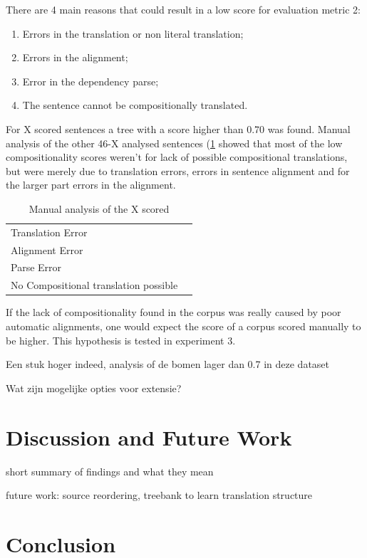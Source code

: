 \documentclass{report}
\theoremstyle{definition}
\theoremstyle{plain}
\begin{document}
There are 4 main reasons that could result in a low score for evaluation metric 2:
\begin{enumerate}
\item Errors in the translation or non literal translation;
\item Errors in the alignment;
\item Error in the dependency parse;
\item The sentence cannot be compositionally translated.
\end{enumerate}

For X scored sentences a tree with a score higher than 0.70 was found. Manual analysis of the other 46-X analysed sentences (\ref{tab:class} showed that most of the low compositionality scores weren't for lack of possible compositional translations, but were merely due to translation errors, errors in sentence alignment and for the larger part errors in the alignment.

\begin{table}[!h]\label{tab:class}
\begin{tabular}{|l|l|}
\hline
Translation Error & \\
Alignment Error & \\
Parse Error &\\
No Compositional translation possible & \\
\hline
\end{tabular}
\caption{Manual analysis of the X scored}
\end{table}

If the lack of compositionality found in the corpus was really caused by poor automatic alignments, one would expect the score of a corpus scored manually to be higher. This hypothesis is tested in experiment 3.

Een stuk hoger indeed, analysis of de bomen lager dan 0.7 in deze dataset

Wat zijn mogelijke opties voor extensie?

\chapter{Discussion and Future Work}

short summary of findings and what they mean

future work: source reordering, treebank to learn translation structure


\chapter{Conclusion}
\end{document}

